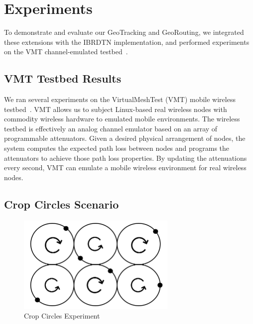 \section{Experiments}\label{sec:experiments}
To demonstrate and evaluate our GeoTracking and GeoRouting, 
we integrated these extensions with the IBRDTN implementation, and performed experiments on 
the VMT channel-emulated testbed~\cite{hahn10:using, kim11:reality}.  

\subsection{VMT Testbed Results}\label{sec:vmtresults}
We ran several experiments on the VirtualMeshTest (VMT)
mobile wireless testbed~\cite{hahn10:using, kim11:reality}.
VMT allows us to subject Linux-based real wireless nodes with commodity 
wireless hardware to emulated mobile environments.  The 
wireless testbed is effectively an analog channel emulator based
on an array of programmable attenuators.  Given a desired physical arrangement
of nodes, the system computes the expected path loss between
nodes and programs the attenuators to achieve those path loss
properties.  By updating the attenuations every second, VMT can
emulate a mobile wireless environment for real wireless nodes.

\subsection{Crop Circles Scenario}



\begin{figure}
\vspace{-.2cm}
\begin{center}
\includegraphics[width=3in]{figures/cropcircle1.png}
\end{center}
\vspace{-.4cm}
\caption{Crop Circles Experiment}\label{fig:cropcircle1}
\vspace{-.35cm}
\end{figure}

